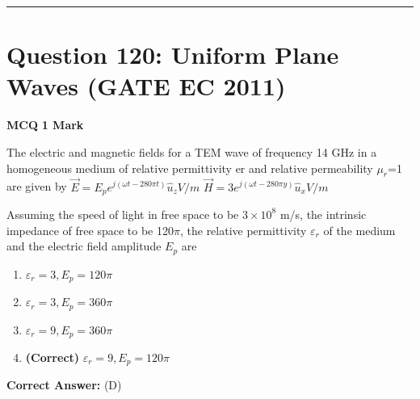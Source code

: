 \documentclass[11pt,a4paper]{article}
\begin{document}
\vspace{1.5em}
\hrule
\vspace{1.5em}

\section*{Question 120: Uniform Plane Waves (GATE EC 2011)}
\noindent \textbf{\color{primary}MCQ} \hfill \textbf{\color{secondary}1 Mark}


\noindent The electric and magnetic fields for a TEM wave of frequency 14 GHz in a
homogeneous medium of relative permittivity er and relative permeability $\mu _{r}$=1 are given by
 $\vec{E}=E_{p}e^{j(\omega t-280\pi t)}\hat{u}_{z} V/m$ 
$\vec{H}=3e^{j(\omega t-280\pi y)}\hat{u}_{x} V/m$ 

Assuming the speed of light in free space to be $3 \times 10^{8}$ m/s, the intrinsic impedance of free space to be 120$\pi$, the relative permittivity $\varepsilon_{r}$ of the medium and the electric field amplitude $E_{p}$ are


\begin{enumerate}[label=(\Alph*)]
    \item $\varepsilon _{r}=3,E_{p}=120 \pi$
    \item $\varepsilon _{r}=3,E_{p}=360 \pi$
    \item $\varepsilon _{r}=9,E_{p}=360 \pi$
    \item \textbf{(Correct)} $\varepsilon _{r}=9,E_{p}=120 \pi$
\end{enumerate}

\noindent \textbf{Correct Answer:} (D)
\end{document}
